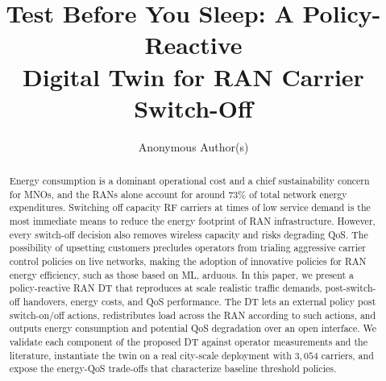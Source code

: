 \documentclass[sigconf, 10pt, anonymous, review]{acmart}
\begin{document}
\title[Test Before You Sleep: A Policy-Reactive Digital Twin for RAN Carrier Switch-Off]{Test Before You Sleep: A Policy-Reactive\\Digital Twin for RAN Carrier Switch-Off}


\author{Anonymous Author(s)}

\renewcommand{\shortauthors}{Anon.}




\begin{abstract}
Energy consumption is a dominant operational cost and a chief sustainability concern for \acp{MNO}, and the \acp{RAN} alone account for around $73\%$ of total network energy expenditures. 
Switching off capacity \ac{RF} carriers at times of low service demand is the most immediate means to reduce the energy footprint of RAN infrastructure. However, every switch-off decision also removes wireless capacity and risks  
degrading \ac{QoS}.
The possibility of upsetting customers precludes operators from trialing aggressive carrier control policies on live networks, making the adoption of innovative policies for RAN energy efficiency, such as those based on \ac{ML}, arduous.
In this paper, we present a policy-reactive \ac{RAN} \ac{DT} that reproduces at scale realistic traffic demands, post-switch-off handovers, energy costs, and \ac{QoS} performance. 
The \ac{DT} lets an external policy post switch-on/off actions, redistributes load across the RAN according to such actions, and outputs energy consumption and potential \ac{QoS} degradation over an open interface. 
We validate each component of the proposed \ac{DT} against operator measurements and the literature, instantiate the twin on a real city-scale deployment with $3{,}054$ carriers, and expose the energy-\ac{QoS} trade-offs that characterize baseline threshold policies.
\end{abstract}

\maketitle
\end{document}
